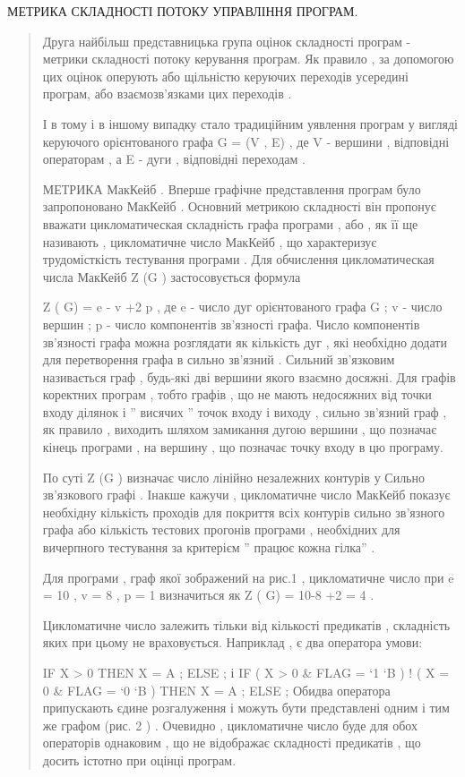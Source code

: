 \documentclass[oneside,final,14pt]{extreport}
\begin{document}
МЕТРИКА СКЛАДНОСТІ ПОТОКУ УПРАВЛІННЯ ПРОГРАМ.
\begin{quote}

Друга найбільш представницька група оцінок складності програм - метрики складності потоку керування програм. Як правило , за допомогою цих оцінок оперують або щільністю керуючих переходів усередині програм, або взаємозв'язками цих переходів .

І в тому і в іншому випадку стало традиційним уявлення програм у вигляді керуючого орієнтованого графа G = (V , E) , де V - вершини , відповідні операторам , а E - дуги , відповідні переходам .

МЕТРИКА МакКейб .
Вперше графічне представлення програм було запропоновано МакКейб . Основний метрикою складності він пропонує вважати цикломатическая складність графа програми , або , як її ще називають , цикломатичне число МакКейб , що характеризує трудомісткість тестування програми .
Для обчислення цикломатическая числа МакКейб Z (G ) застосовується формула

Z ( G) = e - v +2 p ,
де e - число дуг орієнтованого графа G ;
v - число вершин ;
p - число компонентів зв'язності графа.
Число компонентів зв'язності графа можна розглядати як кількість дуг , які необхідно додати для перетворення графа в сильно зв'язний . Сильний зв'язковим називається граф , будь-які дві вершини якого взаємно досяжні. Для графів коректних програм , тобто графів , що не мають недосяжних від точки входу ділянок і '' висячих '' точок входу і виходу , сильно зв'язний граф , як правило , виходить шляхом замикання дугою вершини , що позначає кінець програми , на вершину , що позначає точку входу в цю програму.

По суті Z (G ) визначає число лінійно незалежних контурів у Сильно зв'язкового графі . Інакше кажучи , цикломатичне число МакКейб показує необхідну кількість проходів для покриття всіх контурів сильно зв'язного графа або кількість тестових прогонів програми , необхідних для вичерпного тестування за критерієм '' працює кожна гілка'' .

Для програми , граф якої зображений на рис.1 , цикломатичне число при e = 10 , v = 8 , p = 1 визначиться як Z ( G) = 10-8 +2 = 4 .

Цикломатичне число залежить тільки від кількості предикатів , складність яких при цьому не враховується. Наприклад , є два оператора умови:

IF X \textgreater{} 0
THEN X = A ;
ELSE ;
і
IF ( X \textgreater{} 0 \& FLAG = `1 `B ) !
( X = 0 \& FLAG = `0 `B )
THEN X = A ;
ELSE ;
Обидва оператора припускають єдине розгалуження і можуть бути представлені одним і тим же графом (рис. 2 ) . Очевидно , цикломатичне число буде для обох операторів однаковим , що не відображає складності предикатів , що досить істотно при оцінці програм.
\end{quote}
\end{document}
